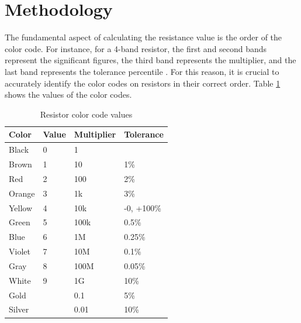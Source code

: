\documentclass[preprint,12pt,3p,times]{elsarticle}
\begin{document}
\section{Methodology}\label{s_method}
The fundamental aspect of calculating the resistance value is the order of the color code. For instance, for a 4-band resistor, the first and second bands represent the significant figures, the third band represents the multiplier, and the last band represents the tolerance percentile \cite{ref4}. For this reason, it is crucial to accurately identify the color codes on resistors in their correct order. Table \ref{t_data_stats} shows the values of the color codes.

\begin{table}[!h]
    \centering
    \caption{\label{t_data_stats}Resistor color code values}
    \begin{tabular}{|l|l|l|l|}
    \hline
    \textbf{Color} & \textbf{Value} & \textbf{Multiplier} & \textbf{Tolerance} \\ \hline
    Black          & 0              & 1                   &                   \\ \hline
    Brown          & 1              & 10                  & 1\%               \\ \hline
    Red            & 2              & 100                 & 2\%               \\ \hline
    Orange         & 3              & 1k                  & 3\%                 \\ \hline
    Yellow         & 4              & 10k       
              & -0, +100\%               \\ \hline
    Green          & 5              & 100k                & 0.5\%             \\ \hline
    Blue           & 6              & 1M                  & 0.25\%            \\ \hline
    Violet         & 7              & 10M                 & 0.1\%             \\ \hline
    Gray           & 8              & 100M                & 0.05\%            \\ \hline
    White          & 9              & 1G                  & 10\%                  \\ \hline
    Gold           &                & 0.1                 & 5\%               \\ \hline
    Silver         &                & 0.01                & 10\%              \\ \hline
    \end{tabular}
    \end{table}
\end{document}
